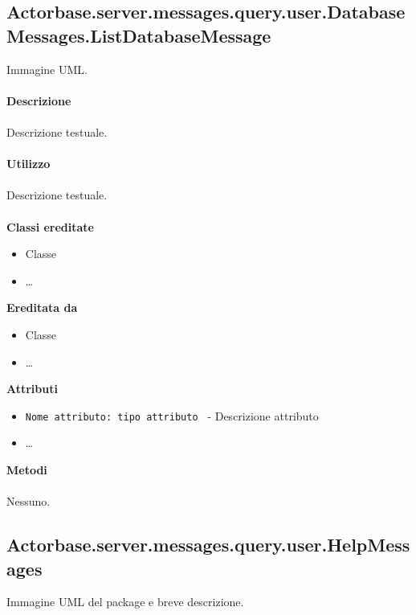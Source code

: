 \documentclass[a4paper]{article}
\begin{document}
	\subsection{Actorbase.server.messages.query.user.DatabaseMessages.ListDatabaseMessage}
		Immagine UML.
		\\ \\
		\textbf{Descrizione}
			\\ \\
			Descrizione testuale.
			\\ \\
		\textbf{Utilizzo}
			\\ \\
			Descrizione testuale.
			\\ \\
		\textbf{Classi ereditate}
			\begin{itemize}
				\item Classe
				\item \dots
			\end{itemize}
		\textbf{Ereditata da}
			\begin{itemize}
				\item Classe
				\item \dots
			\end{itemize}
		\textbf{Attributi}
			\begin{itemize}
				\item \texttt{Nome attributo: tipo attributo } - Descrizione attributo
				\item \dots
			\end{itemize}
		\textbf{Metodi}
			\\ \\
			Nessuno.	
			
	\subsection{Actorbase.server.messages.query.user.HelpMessages}
		Immagine UML del package e breve descrizione.
		
\end{document}
